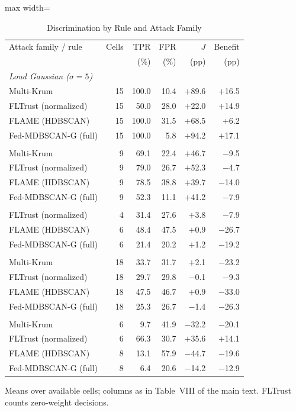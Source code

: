 \begin{table}[!t]
\centering\footnotesize
\setlength{\tabcolsep}{4pt}
\caption{Discrimination by Rule and Attack Family}\label{tab:discrimination_method}
\begin{adjustbox}{max width=\columnwidth}
\begin{tabular}{lrrrrr}
\toprule
Attack family / rule & Cells & TPR & FPR & $J$ & Benefit \\
 &  & (\%) & (\%) & (pp) & (pp) \\
\midrule
\multicolumn{6}{l}{\emph{Loud Gaussian ($\sigma=5$)}} \\
\quad Multi-Krum & 15 & 100.0 & 10.4 & $+$89.6 & $+$16.5 \\
\quad FLTrust (normalized) & 15 & 50.0 & 28.0 & $+$22.0 & $+$14.9 \\
\quad FLAME (HDBSCAN) & 15 & 100.0 & 31.5 & $+$68.5 & $+$6.2 \\
\quad Fed-MDBSCAN-G (full) & 15 & 100.0 & 5.8 & $+$94.2 & $+$17.1 \\
\addlinespace[3pt]
\multicolumn{6}{l}{\emph{Label flipping}} \\
\quad Multi-Krum & 9 & 69.1 & 22.4 & $+$46.7 & $-$9.5 \\
\quad FLTrust (normalized) & 9 & 79.0 & 26.7 & $+$52.3 & $-$4.7 \\
\quad FLAME (HDBSCAN) & 9 & 78.5 & 38.8 & $+$39.7 & $-$14.0 \\
\quad Fed-MDBSCAN-G (full) & 9 & 52.3 & 11.1 & $+$41.2 & $-$7.9 \\
\addlinespace[3pt]
\multicolumn{6}{l}{\emph{Patch backdoor}} \\
\quad FLTrust (normalized) & 4 & 31.4 & 27.6 & $+$3.8 & $-$7.9 \\
\quad FLAME (HDBSCAN) & 6 & 48.4 & 47.5 & $+$0.9 & $-$26.7 \\
\quad Fed-MDBSCAN-G (full) & 6 & 21.4 & 20.2 & $+$1.2 & $-$19.2 \\
\addlinespace[3pt]
\multicolumn{6}{l}{\emph{Bounded random direction}} \\
\quad Multi-Krum & 18 & 33.7 & 31.7 & $+$2.1 & $-$23.2 \\
\quad FLTrust (normalized) & 18 & 29.7 & 29.8 & $-$0.1 & $-$9.3 \\
\quad FLAME (HDBSCAN) & 18 & 47.5 & 46.7 & $+$0.9 & $-$33.0 \\
\quad Fed-MDBSCAN-G (full) & 18 & 25.3 & 26.7 & $-$1.4 & $-$26.3 \\
\addlinespace[3pt]
\multicolumn{6}{l}{\emph{Constrained omniscient}} \\
\quad Multi-Krum & 6 & 9.7 & 41.9 & $-$32.2 & $-$20.1 \\
\quad FLTrust (normalized) & 6 & 66.3 & 30.7 & $+$35.6 & $+$14.1 \\
\quad FLAME (HDBSCAN) & 8 & 13.1 & 57.9 & $-$44.7 & $-$19.6 \\
\quad Fed-MDBSCAN-G (full) & 8 & 6.4 & 20.6 & $-$14.2 & $-$12.9 \\
\bottomrule
\end{tabular}
\end{adjustbox}

\par\vspace{3pt}\parbox{\linewidth}{\footnotesize Means over available cells; columns as in Table~VIII of the main text. FLTrust counts zero-weight decisions.}
\end{table}

